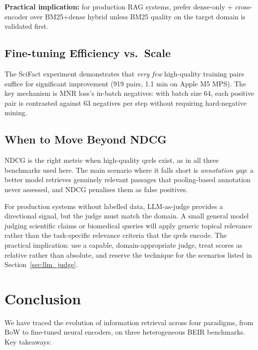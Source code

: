 \documentclass[12pt, a4paper]{article}
\newcommand{\scifact}{SciFact}
\begin{document}
\textbf{Practical implication:} for production RAG systems, prefer
dense-only + cross-encoder over BM25+dense hybrid unless BM25 quality
on the target domain is validated first.

\subsection{Fine-tuning Efficiency vs.\ Scale}

The \scifact{} experiment demonstrates that \emph{very few} high-quality
training pairs suffice for significant improvement (919 pairs, 1.1 min on
Apple M5 MPS).  The key mechanism is MNR loss's in-batch negatives: with
batch size 64, each positive pair is contrasted against 63 negatives per
step without requiring hard-negative mining.

\subsection{When to Move Beyond NDCG}

NDCG is the right metric when high-quality qrels exist, as in all three
benchmarks used here.  The main scenario where it falls short is
\emph{annotation gap}: a better model retrieves genuinely relevant
passages that pooling-based annotation never assessed, and NDCG penalises
them as false positives.

For production systems without labelled data, LLM-as-judge provides a
directional signal, but the judge must match the domain.  A small general
model judging scientific claims or biomedical queries will apply generic
topical relevance rather than the task-specific relevance criteria that the
qrels encode.  The practical implication: use a capable, domain-appropriate
judge, treat scores as relative rather than absolute, and reserve the
technique for the scenarios listed in Section~\ref{sec:llm_judge}.

\section{Conclusion}
\label{sec:conclusion}

We have traced the evolution of information retrieval across four paradigms,
from BoW to fine-tuned neural encoders, on three heterogeneous BEIR benchmarks.
Key takeaways:
\end{document}
